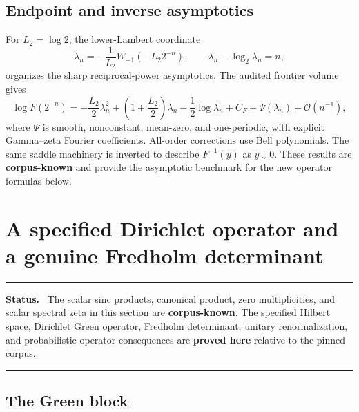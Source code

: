 \documentclass[11pt,oneside]{article}
\theoremstyle{definition}
\newcommand{\bigO}{\mathcal O}
\newcommand{\CorpusKnown}{\textcolor{linkblue}{\textbf{corpus-known}}}
\newcommand{\ProvedHere}{\textcolor{deepgreen}{\textbf{proved here}}}
\newenvironment{statusbox}[1]{%
  \par\medskip\begin{center}\begin{minipage}{0.94\textwidth}%
  \hrule\medskip\textbf{#1.}\ }%
  {\par\medskip\hrule\end{minipage}\end{center}\medskip}
\begin{document}
\subsection{Endpoint and inverse asymptotics}

For \(L_2=\log2\), the lower-Lambert coordinate
\begin{equation}
 \lambda_n=-\frac1{L_2}W_{-1}(-L_2 2^{-n}),
 \qquad \lambda_n-\log_2\lambda_n=n,
 \label{eq:lambda-n}
\end{equation}
organizes the sharp reciprocal-power asymptotics.  The audited frontier volume gives
\begin{equation}
 \log F(2^{-n})
 =-\frac{L_2}{2}\lambda_n^2
 +\left(1+\frac{L_2}{2}\right)\lambda_n
 -\frac12\log\lambda_n+C_F+\Psi(\lambda_n)+\bigO(n^{-1}),
 \label{eq:sharp-dyadic-asymptotic}
\end{equation}
where \(\Psi\) is smooth, nonconstant, mean-zero, and one-periodic, with explicit
Gamma--zeta Fourier coefficients.  All-order corrections use Bell polynomials.  The
same saddle machinery is inverted to describe \(F^{-1}(y)\) as \(y\downarrow0\).
These results are \CorpusKnown{} and provide the asymptotic benchmark for the new
operator formulas below.

\section{A specified Dirichlet operator and a genuine Fredholm determinant}
\label{sec:operator}

\begin{statusbox}{Status}
The scalar sinc products, canonical product, zero multiplicities, and scalar spectral
zeta in this section are \CorpusKnown{}.  The specified Hilbert space, Dirichlet Green
operator, Fredholm determinant, unitary renormalization, and probabilistic operator
consequences are \ProvedHere{} relative to the pinned corpus.
\end{statusbox}

\subsection{The Green block}
\end{document}
